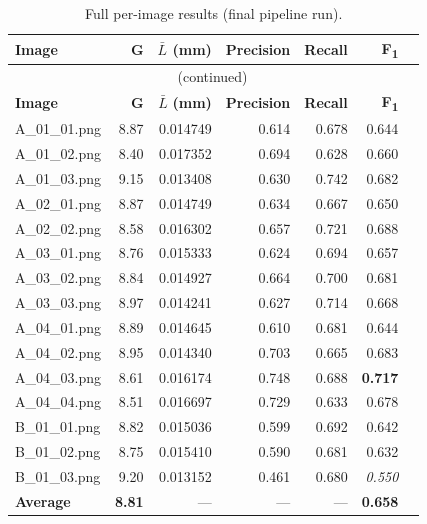 \documentclass[12pt,a4paper]{article}
\begin{document}
\begin{longtable}{lrrrrrr}
    \caption{Full per-image results (final pipeline run).}
    \label{tab:results} \\
    \toprule
    \textbf{Image} & \textbf{G} & \boldmath$\bar{L}$\textbf{ (mm)} &
    \textbf{Precision} & \textbf{Recall} & \textbf{F\textsubscript{1}} \\
    \midrule
    \endfirsthead

    \multicolumn{6}{c}{\tablename~\thetable{} (continued)} \\
    \toprule
    \textbf{Image} & \textbf{G} & \boldmath$\bar{L}$\textbf{ (mm)} &
    \textbf{Precision} & \textbf{Recall} & \textbf{F\textsubscript{1}} \\
    \midrule
    \endhead

    \bottomrule
    \endfoot

    A\_01\_01.png & 8.87 & 0.014749 & 0.614 & 0.678 & 0.644 \\
    A\_01\_02.png & 8.40 & 0.017352 & 0.694 & 0.628 & 0.660 \\
    A\_01\_03.png & 9.15 & 0.013408 & 0.630 & 0.742 & 0.682 \\
    A\_02\_01.png & 8.87 & 0.014749 & 0.634 & 0.667 & 0.650 \\
    A\_02\_02.png & 8.58 & 0.016302 & 0.657 & 0.721 & 0.688 \\
    A\_03\_01.png & 8.76 & 0.015333 & 0.624 & 0.694 & 0.657 \\
    A\_03\_02.png & 8.84 & 0.014927 & 0.664 & 0.700 & 0.681 \\
    A\_03\_03.png & 8.97 & 0.014241 & 0.627 & 0.714 & 0.668 \\
    A\_04\_01.png & 8.89 & 0.014645 & 0.610 & 0.681 & 0.644 \\
    A\_04\_02.png & 8.95 & 0.014340 & 0.703 & 0.665 & 0.683 \\
    A\_04\_03.png & 8.61 & 0.016174 & 0.748 & 0.688 & \textbf{0.717} \\
    A\_04\_04.png & 8.51 & 0.016697 & 0.729 & 0.633 & 0.678 \\
    B\_01\_01.png & 8.82 & 0.015036 & 0.599 & 0.692 & 0.642 \\
    B\_01\_02.png & 8.75 & 0.015410 & 0.590 & 0.681 & 0.632 \\
    B\_01\_03.png & 9.20 & 0.013152 & 0.461 & 0.680 & \textit{0.550} \\
    \midrule
    \textbf{Average} & \textbf{8.81} & --- & --- & --- & \textbf{0.658} \\
    \bottomrule
\end{longtable}
\end{document}
